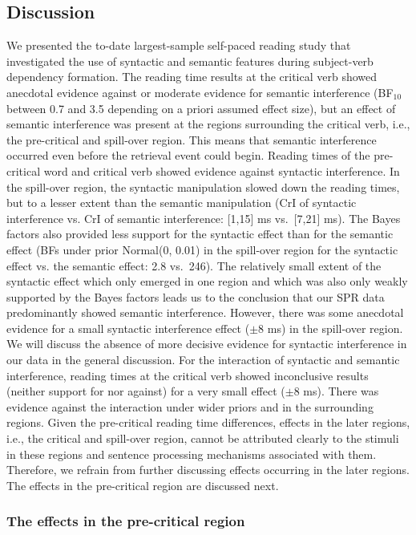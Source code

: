 \documentclass[review,preprint,12pt,authoryear,floatsintext]{elsarticle}
\begin{document}
\subsection{Discussion}
We presented the to-date largest-sample self-paced reading study that investigated the use of syntactic and semantic features during subject-verb dependency formation. {The reading time results at the critical verb showed anecdotal evidence against or moderate evidence for semantic interference (BF$_{10}$ between 0.7 and 3.5 depending on a priori assumed effect size), but an effect of semantic interference was present at the regions surrounding the critical verb, i.e., the pre-critical and spill-over region. This means that semantic interference occurred even before the retrieval event could begin. Reading times of the pre-critical word and critical verb showed evidence against syntactic interference. In the spill-over region, the syntactic manipulation slowed down the reading times, but to a lesser extent than the semantic manipulation (CrI of syntactic interference vs. CrI of semantic interference: [1,15] ms vs.\ [7,21] ms). The Bayes factors also provided less support for the syntactic effect than for the semantic effect (BFs under prior Normal(0, 0.01) in the spill-over region for the syntactic effect vs. the semantic effect: 2.8 vs.\ 246). The relatively small extent of the syntactic effect which only emerged in one region and which was also only weakly supported by the Bayes factors leads us to the conclusion that our SPR data predominantly showed semantic interference. However, there was some anecdotal evidence for a small syntactic interference effect ($\pm$8 ms) in the spill-over region.}\label{syn_interf} We will discuss the absence of more decisive evidence for syntactic interference in our data in the general discussion. For the interaction of syntactic and semantic interference, reading times at the critical verb showed inconclusive results (neither support for nor against) for a very small effect ($\pm$8 ms). There was evidence against the interaction under wider priors and in the surrounding regions. {Given the pre-critical reading time differences, effects in the later regions, i.e., the critical and spill-over region, cannot be attributed clearly to the stimuli in these regions and sentence processing mechanisms associated with them. Therefore, we refrain from further discussing effects occurring in the later regions.}\label{only_precritical} The effects in the pre-critical region are discussed next.

\subsubsection{The effects in the pre-critical region}
\end{document}
